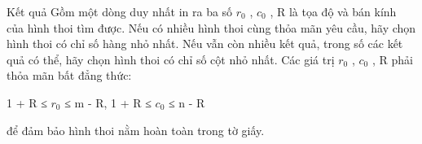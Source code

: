 Kết quả
Gồm một dòng duy nhất in ra ba số $r_{0}$   , $c_{0}$   , R là tọa độ và bán kính của hình thoi tìm được. Nếu có nhiều hình thoi cùng thỏa mãn yêu cầu, hãy chọn hình thoi có chỉ số hàng nhỏ nhất. Nếu vẫn còn nhiều kết quả, trong số các kết quả có thể, hãy chọn hình thoi có chỉ số cột nhỏ nhất. Các giá trị $r_{0}$   , $c_{0}$   , R phải thỏa mãn bất đẳng thức:  

   1 + R ≤ $r_{0}$   ≤ m - R, 1 + R ≤ $c_{0}$   ≤ n - R  

   để đảm bảo hình thoi nằm hoàn toàn trong tờ giấy.